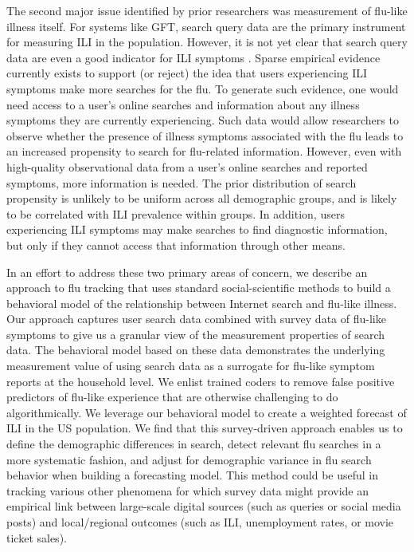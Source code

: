 \documentclass[fleqn,10pt]{wlscirep}
\begin{document}
The second major issue identified by prior researchers was measurement of flu-like illness itself. For systems like GFT, search query data are the primary instrument for measuring ILI in the population. However, it is not yet clear that search query data are even a good indicator for ILI symptoms \cite{lazer_etal_2014}. Sparse empirical evidence currently exists to support (or reject) the idea that users experiencing ILI symptoms make more searches for the flu. To generate such evidence, one would need access to a user's online searches and information about any illness symptoms they are currently experiencing. Such data would allow researchers to observe whether the presence of illness symptoms associated with the flu leads to an increased propensity to search for flu-related information. However, even with high-quality observational data from a user's online searches and reported symptoms, more information is needed. The prior distribution of search propensity is unlikely to be uniform across all demographic groups, and is likely to be correlated with ILI prevalence within groups. In addition, users experiencing ILI symptoms may make searches to find diagnostic information, but only if they cannot access that information through other means. 

In an effort to address these two primary areas of concern, we describe an approach to flu tracking that uses standard social-scientific methods to build a behavioral model of the relationship between Internet search and flu-like illness. Our approach captures user search data combined with survey data of flu-like symptoms to give us a granular view of the measurement properties of search data. The behavioral model based on these data demonstrates the underlying measurement value of using search data as a surrogate for flu-like symptom reports at the household level. We enlist trained coders to remove false positive predictors of flu-like experience that are otherwise challenging to do algorithmically. We leverage our behavioral model to create a weighted forecast of ILI in the US population. We find that this survey-driven approach enables us to define the demographic differences in search, detect relevant flu searches in a more systematic fashion, and adjust for demographic variance in flu search behavior when building a forecasting model. This method could be useful in tracking various other phenomena for which survey data might provide an empirical link between large-scale digital sources (such as queries or social media posts) and local/regional outcomes (such as ILI, unemployment rates, or movie ticket sales). 
\end{document}
